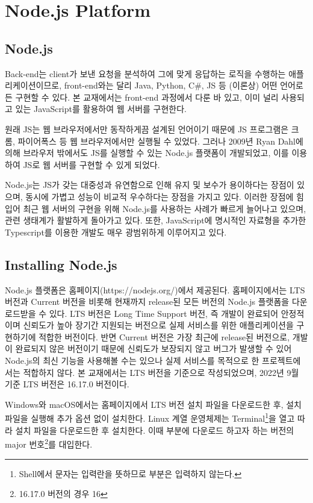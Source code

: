 \section{Node.js Platform}\label{sect:node-js-platform}

\subsection*{Node.js}

Back-end는 client가 보낸 요청을 분석하여 그에 맞게 응답하는 로직을 수행하는 애플리케이션이므로, front-end와는 달리 Java, Python, C\#, JS 등 (이론상) 어떤 언어로든 구현할 수 있다. 본 교재에서는 front-end 과정에서 다룬 바 있고, 이미 널리 사용되고 있는 JavaScript를 활용하여 웹 서버를 구현한다.

원래 JS는 웹 브라우저에서만 동작하게끔 설계된 언어이기 때문에 JS 프로그램은 크롬, 파이어폭스 등 웹 브라우저에서만 실행될 수 있었다. 그러나 2009년 Ryan Dahl에 의해 브라우저 밖에서도 JS를 실행할 수 있는 Node.js 플랫폼이 개발되었고, 이를 이용하여 JS로 웹 서버를 구현할 수 있게 되었다.

Node.js는 JS가 갖는 대중성과 유연함으로 인해 유지 및 보수가 용이하다는 장점이 있으며, 동시에 가볍고 성능이 비교적 우수하다는 장점을 가지고 있다. 이러한 장점에 힘입어 최근 웹 서버의 구현을 위해 Node.js를 사용하는 사례가 빠르게 늘어나고 있으며, 관련 생태계가 활발하게 돌아가고 있다. 또한, JavaScript에 명시적인 자료형을 추가한 Typescript를 이용한 개발도 매우 광범위하게 이루어지고 있다.

\subsection*{Installing Node.js}

Node.js 플랫폼은 홈페이지(https://nodejs.org/)에서 제공된다. 홈페이지에서는 LTS 버전과 Current 버전을 비롯해 현재까지 release된 모든 버전의 Node.js 플랫폼을 다운로드받을 수 있다. LTS 버전은 Long Time Support 버전, 즉 개발이 완료되어 안정적이며 신뢰도가 높아 장기간 지원되는 버전으로 실제 서비스를 위한 애플리케이션을 구현하기에 적합한 버전이다. 반면 Current 버전은 가장 최근에 release된 버전으로, 개발이 완료되지 않은 버전이기 때문에 신뢰도가 보장되지 않고 버그가 발생할 수 있어 Node.js의 최신 기능을 사용해볼 수는 있으나 실제 서비스를 목적으로 한 프로젝트에서는 적합하지 않다. 본 교재에서는 LTS 버전을 기준으로 작성되었으며, 2022년 9월 기준 LTS 버전은 16.17.0 버전이다.

Windows와 macOS에서는 홈페이지에서 LTS 버전 설치 파일을 다운로드한 후, 설치 파일을 실행해 추가 옵션 없이 설치한다. Linux 계열 운영체제는 Terminal\footnote{Shell에서 \cd{\$} 문자는 입력란을 뜻하므로 \cd{\$ } 부분은 입력하지 않는다.}을 열고 \을 따라 설치 파일을 다운로드한 후 설치한다. 이때  부분에 다운로드 하고자 하는 버전의 major 번호\footnote{16.17.0 버전의 경우 16}를 대입한다.

